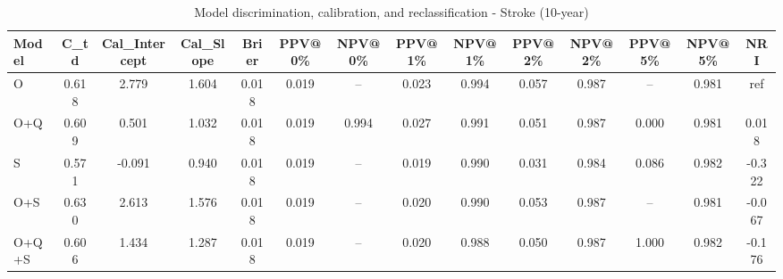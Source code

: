 \begin{table}[htbp]
\centering
\small
\caption{Model discrimination, calibration, and reclassification - Stroke (10-year)}
\label{tab:perf_stroke_10y}
\begin{tabular}{lccccccccccccc}
\toprule
Model & C\_td & Cal\_Intercept & Cal\_Slope & Brier & PPV@0\% & NPV@0\% & PPV@1\% & NPV@1\% & PPV@2\% & NPV@2\% & PPV@5\% & NPV@5\% & NRI \\
\midrule
O & 0.618 & 2.779 & 1.604 & 0.018 & 0.019 & -- & 0.023 & 0.994 & 0.057 & 0.987 & -- & 0.981 & ref \\
O+Q & 0.609 & 0.501 & 1.032 & 0.018 & 0.019 & 0.994 & 0.027 & 0.991 & 0.051 & 0.987 & 0.000 & 0.981 & 0.018 \\
S & 0.571 & -0.091 & 0.940 & 0.018 & 0.019 & -- & 0.019 & 0.990 & 0.031 & 0.984 & 0.086 & 0.982 & -0.322 \\
O+S & 0.630 & 2.613 & 1.576 & 0.018 & 0.019 & -- & 0.020 & 0.990 & 0.053 & 0.987 & -- & 0.981 & -0.067 \\
O+Q+S & 0.606 & 1.434 & 1.287 & 0.018 & 0.019 & -- & 0.020 & 0.988 & 0.050 & 0.987 & 1.000 & 0.982 & -0.176 \\
\bottomrule
\end{tabular}
\end{table}